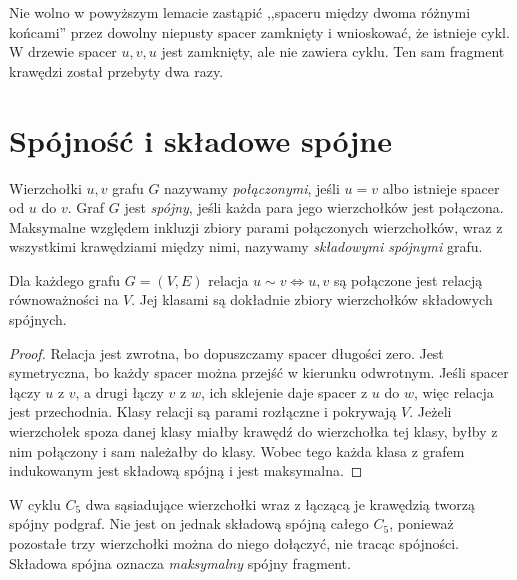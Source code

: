 \begin{uwaga}
Nie wolno w powyższym lemacie zastąpić ,,spaceru między
dwoma różnymi końcami'' przez dowolny niepusty spacer
zamknięty i wnioskować, że istnieje cykl. W drzewie
spacer $u,v,u$ jest zamknięty, ale nie zawiera cyklu.
Ten sam fragment krawędzi został przebyty dwa razy.
\end{uwaga}

\section{Spójność i składowe spójne}
\label{sec:tg-spojnosc}

\begin{definicja}[Spójność]
Wierzchołki $u,v$ grafu $G$ nazywamy
\emph{połączonymi}, jeśli $u=v$ albo istnieje
spacer od $u$ do $v$. Graf $G$ jest \emph{spójny},
jeśli każda para jego wierzchołków jest połączona.
Maksymalne względem inkluzji zbiory parami połączonych
wierzchołków, wraz z wszystkimi krawędziami między nimi,
nazywamy \emph{składowymi spójnymi} grafu.
\end{definicja}

\begin{stwierdzenie}
Dla każdego grafu $G=(V,E)$ relacja
$u\sim v\iff u,v$ są połączone jest relacją
równoważności na $V$. Jej klasami są dokładnie
zbiory wierzchołków składowych spójnych.
\end{stwierdzenie}

\begin{proof}
Relacja jest zwrotna, bo dopuszczamy spacer długości zero.
Jest symetryczna, bo każdy spacer można przejść w kierunku
odwrotnym. Jeśli spacer łączy $u$ z $v$, a drugi łączy
$v$ z $w$, ich sklejenie daje spacer z $u$ do $w$,
więc relacja jest przechodnia. Klasy relacji są
parami rozłączne i pokrywają $V$. Jeżeli wierzchołek
spoza danej klasy miałby krawędź do wierzchołka tej klasy,
byłby z nim połączony i sam należałby do klasy. Wobec
tego każda klasa z grafem indukowanym jest składową
spójną i jest maksymalna.
\end{proof}

\begin{przyklad}
W cyklu $C_5$ dwa sąsiadujące wierzchołki wraz z
łączącą je krawędzią tworzą spójny podgraf. Nie jest
on jednak składową spójną całego $C_5$, ponieważ
pozostałe trzy wierzchołki można do niego dołączyć,
nie tracąc spójności. Składowa spójna oznacza
\emph{maksymalny} spójny fragment.
\end{przyklad}

